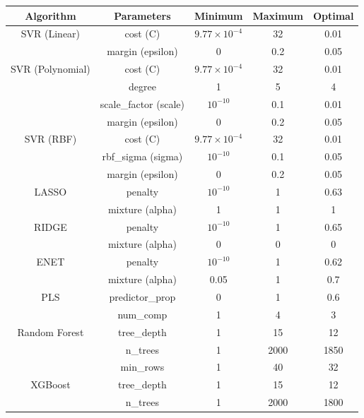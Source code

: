 \documentclass[10pt, a4paper, oneside]{article}
\begin{document}
\renewcommand{\arraystretch}{1.5}
\setlength{\tabcolsep}{4pt}
\begin{table}
    \centering
    \begin{tabular}{ccccc}
        \hline
        \textbf{Algorithm} & \textbf{Parameters} & \textbf{Minimum} & \textbf{Maximum} & \textbf{Optimal} \\
        \hline
        SVR (Linear) & cost (C) & $9.77 \times 10^{-4}$ & 32 & 0.01 \\
                     & margin (epsilon) & 0 & 0.2 & 0.05\\
        \hline
        SVR (Polynomial) & cost (C) & $9.77 \times 10^{-4}$ & 32 & 0.01 \\
                         & degree & 1 & 5 & 4 \\
                         & scale\_factor (scale) & $10^{-10}$ & 0.1 & 0.01 \\
                         & margin (epsilon) & 0 & 0.2 & 0.05 \\
        \hline
        SVR (RBF) & cost (C) & $9.77 \times 10^{-4}$ & 32 & 0.01 \\
                  & rbf\_sigma (sigma) & $10^{-10}$ & 0.1 & 0.05 \\
                  & margin (epsilon) & 0 & 0.2 & 0.05 \\
        \hline
        LASSO & penalty & $10^{-10}$ & 1 & 0.63 \\
              & mixture (alpha) & 1 & 1 & 1 \\
        \hline
        RIDGE & penalty & $10^{-10}$ & 1 & 0.65 \\
              & mixture (alpha) & 0 & 0 & 0 \\
        \hline
        ENET & penalty & $10^{-10}$ & 1 & 0.62 \\
             & mixture (alpha) & 0.05 & 1 & 0.7 \\
        \hline
        PLS & predictor\_prop & 0 & 1 & 0.6 \\
            & num\_comp & 1 & 4 & 3 \\
        \hline
        Random Forest & tree\_depth & 1 & 15 & 12 \\
                      & n\_trees & 1 & 2000 & 1850 \\
                      & min\_rows & 1 & 40 & 32 \\
        \hline 
        XGBoost & tree\_depth & 1 & 15 & 12 \\
                & n\_trees & 1 & 2000 & 1800 \\

\end{tabular}
\end{table}
\end{document}
